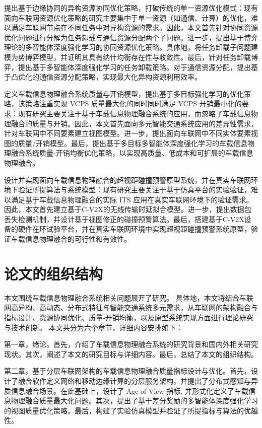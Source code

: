  提出基于边缘协同的异构资源协同优化策略，打破传统的单一资源优化模式：现有面向车联网资源优化策略的研究主要集中于单一资源（如通信、计算）的优化，难以满足车联网节点在不同任务中对异构资源的需求。因此，本文首先针对协同资源优化问题进行分解为任务卸载与通信资源分配两个子问题。进一步，提出基于博弈理论的多智能体深度强化学习的协同资源优化策略。具体地，将任务卸载子问题建模为势博弈模型，并证明其具有纳什均衡存在性与收敛性。最后，针对任务卸载博弈，提出基于多智能体深度强化学习的任务卸载策略。对于通信资源分配，提出基于凸优化的通信资源分配策略，实现最大化异构资源利用效率。

 定义车载信息物理融合系统质量与开销模型，提出基于多目标强化学习的优化策略，该策略注重实现 VCPS 质量最大化的同时同时满足 VCPS 开销最小化的要求：现有研究主要关注于基于车载信息物理融合系统的应用，而忽略了车载信息物理融合的质量与开销。因此，本文首先面向多元智能交通系统应用的差异性需求，针对车联网中不同要素建立视图模型。进一步，提出面向车联网中不同实体要素视图的质量/开销模型。最后，提出基于多目标多智能体深度强化学习的车载信息物理融合系统质量-开销均衡优化策略，以实现高质量、低成本和可扩展的车载信息物理融合。

 设计并实现面向车载信息物理融合的超视距碰撞预警原型系统，并在真实车联网环境下验证所提算法与系统模型：现有研究主要关注于基于仿真平台的实验验证，难以满足基于车载信息物理融合的实际 ITS 应用在真实车联网环境下的验证需求。因此，本文首先建立基于C-V2X的无线传输时延拟合模型。进一步，提出数据包丢失检测机制，并设计基于视图修正的碰撞预警算法。最后，搭建基于C-V2X设备的硬件在环试验平台，并在真实车联网环境中实现超视距碰撞预警系统原型，验证车载信息物理融合的可行性和有效性。

\section{论文的组织结构}\label{section 1-7}
本文围绕车载信息物理融合系统相关问题展开了研究。
具体地，本文将结合车联网高异构、高动态、分布式特征与智能交通系统多元需求，从车联网的架构融合与指标设计、资源协同优化、质量-开销均衡，以及原型系统实现方面进行理论研究与技术创新。
本文共分为六个章节，详细内容安排如下：

第一章，绪论。首先，介绍了车载信息物理融合系统的研究背景和国内外相关研究现状。其次，阐述了本文的研究目标与详细内容。最后，总结了本文的组织结构。

第二章，基于分层车联网架构的车载信息物理融合质量指标设计与优化。首先，设计了融合软件定义网络和移动边缘计算的分层服务架构，并提出了分布式感知与异质信息融合场景。在此基础上，设计了 Age of View 指标, 并形式化定义了车载信息物理融合质量最大化问题。其次，提出了基于差分奖励的多智能体深度强化学习的视图质量优化策略。最后，构建了实验仿真模型并验证了所提指标与算法的优越性。

